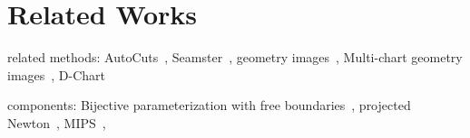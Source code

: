 \section{Related Works}

related methods:
AutoCuts~\cite{Poranne2017Autocuts},
Seamster~\cite{Sheffer2002Seamster},
geometry images~\cite{Gu2002Geometry},
Multi-chart geometry images~\cite{Snyder2003Multi},
D-Chart~\cite{Julius2005D}

components:
Bijective parameterization with free boundaries~\cite{Smith2015Bijective},
projected Newton~\cite{Teran2005Robust},
MIPS~\cite{Hormann2000MIPS},